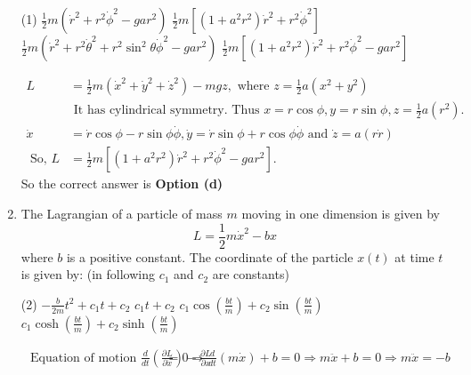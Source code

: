 \begin{enumerate}
{}
	 \begin{tasks}(1)
		\task[\textbf{a.}]$\frac{1}{2} m\left(\dot{r}^{2}+r^{2} \dot{\phi}^{2}-g a r^{2}\right)$
		\task[\textbf{b.}]$\frac{1}{2} m\left[\left(1+a^{2} r^{2}\right) \dot{r}^{2}+r^{2} \dot{\phi}^{2}\right]$
		\task[\textbf{c.}]$\frac{1}{2} m\left(\dot{r}^{2}+r^{2} \dot{\theta}^{2}+r^{2} \sin ^{2} \theta \dot{\phi}^{2}-g a r^{2}\right)$
		\task[\textbf{d.}] $\frac{1}{2} m\left[\left(1+a^{2} r^{2}\right) \dot{r}^{2}+r^{2} \dot{\phi}^{2}-g a r^{2}\right]$
	\end{tasks}
\begin{answer}
	$$
	\begin{aligned}
	L&=\frac{1}{2} m\left(\dot{x}^{2}+\dot{y}^{2}+\dot{z}^{2}\right)-m g z, \text { where } z=\frac{1}{2} a\left(x^{2}+y^{2}\right)\\
	&\text { It has cylindrical symmetry. Thus } x=r \cos \phi, y=r \sin \phi, z=\frac{1}{2} a\left(r^{2}\right) \text {. }\\
	\dot{x}&=\dot{r} \cos \phi-r \sin \phi \dot{\phi}, \dot{y}=\dot{r} \sin \phi+r \cos \phi \dot{\phi} \text { and } \dot{z}=a(r \dot{r})\\
	\text { So, } L&=\frac{1}{2} m\left[\left(1+a^{2} r^{2}\right) \dot{r}^{2}+r^{2} \dot{\phi}^{2}-g a r^{2}\right] \text {. }
\end{aligned}
$$
So the correct answer is \textbf{Option (d)}
\end{answer}
	\item The Lagrangian of a particle of mass $m$ moving in one dimension is given by
	$$
	L=\frac{1}{2} m \dot{x}^{2}-b x
	$$
	where $b$ is a positive constant. The coordinate of the particle $x(t)$ at time $t$ is given by: (in following $c_{1}$ and $c_{2}$ are constants)
{}
	 \begin{tasks}(2)
		\task[\textbf{a.}] $-\frac{b}{2 m} t^{2}+c_{1} t+c_{2}$
		\task[\textbf{b.}]$c_{1} t+c_{2}$
		\task[\textbf{c.}]$c_{1} \cos \left(\frac{b t}{m}\right)+c_{2} \sin \left(\frac{b t}{m}\right)$
		\task[\textbf{d.}] $c_{1} \cosh \left(\frac{b t}{m}\right)+c_{2} \sinh \left(\frac{b t}{m}\right)$
	\end{tasks}
\begin{answer}
	$$
	\begin{aligned}
	\text { Equation of motion } \frac{d}{d t}\left(\frac{\partial L}{\partial \dot{x}}\right)-\frac{\partial L}{\partial x}&=0 \Rightarrow \frac{d}{d t}(m \dot{x})+b=0 \Rightarrow m \ddot{x}+b=0 \Rightarrow m \ddot{x}=-b\\

\end{aligned}$$
\end{answer}
\end{enumerate}
